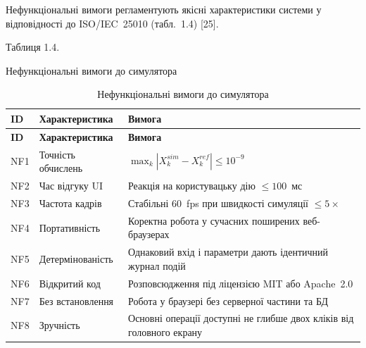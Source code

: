 \documentclass[
]{article}
\begin{document}
Нефункціональні вимоги регламентують якісні характеристики системи у
відповідності до ISO/IEC~25010 (табл.~1.4) {[}25{]}.

Таблиця 1.4.

Нефункціональні вимоги до симулятора

\begin{longtable}[]{@{}
  >{\raggedright\arraybackslash}p{}
  >{\raggedright\arraybackslash}p{}
  >{\raggedright\arraybackslash}p{}@{}}
\caption[Нефункціональні вимоги до симулятора]{Нефункціональні вимоги до
симулятора}\tabularnewline
\toprule\noalign{}
\begin{minipage}[b]{\linewidth}\raggedright
\textbf{ID}
\end{minipage} & \begin{minipage}[b]{\linewidth}\raggedright
\textbf{Характеристика}
\end{minipage} & \begin{minipage}[b]{\linewidth}\raggedright
\textbf{Вимога}
\end{minipage} \\
\midrule\noalign{}
\endfirsthead
\toprule\noalign{}
\begin{minipage}[b]{\linewidth}\raggedright
\textbf{ID}
\end{minipage} & \begin{minipage}[b]{\linewidth}\raggedright
\textbf{Характеристика}
\end{minipage} & \begin{minipage}[b]{\linewidth}\raggedright
\textbf{Вимога}
\end{minipage} \\
\midrule\noalign{}
\endhead
\bottomrule\noalign{}
\endlastfoot
NF1 & Точність обчислень &
\(\max_{k}|X_{k}^{sim} - X_{k}^{ref}| \leq 10^{- 9}\) \\
NF2 & Час відгуку UI & Реакція на користувацьку дію \(\leq 100\)~мс \\
NF3 & Частота кадрів & Стабільні 60~fps при швидкості симуляції
\(\leq 5 \times\) \\
NF4 & Портативність & Коректна робота у сучасних поширених
веб-браузерах \\
NF5 & Детермінованість & Однаковий вхід і параметри дають ідентичний
журнал подій \\
NF6 & Відкритий код & Розповсюдження під ліцензією MIT або Apache~2.0 \\
NF7 & Без встановлення & Робота у браузері без серверної частини та
БД \\
NF8 & Зручність & Основні операції доступні не глибше двох кліків від
головного екрану \\
\end{longtable}
\end{document}
